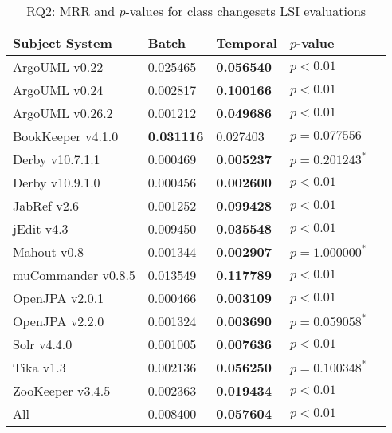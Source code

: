 
\begin{table}[t]
\renewcommand{\arraystretch}{1.3}
\footnotesize
\centering
\caption{RQ2: MRR and $p$-values for class changesets LSI evaluations}
\begin{tabular}{l|ll|ll}
   \toprule
    Subject System & Batch & Temporal & $p$-value  \\
    \midrule

ArgoUML v0.22 & 0.025465 & {\bf 0.056540 } & $p < 0.01$ \\
ArgoUML v0.24 & 0.002817 & {\bf 0.100166 } & $p < 0.01$ \\
ArgoUML v0.26.2 & 0.001212 & {\bf 0.049686 } & $p < 0.01$ \\
BookKeeper v4.1.0 & {\bf 0.031116 } & 0.027403 & $p = 0.077556$ \\
Derby v10.7.1.1 & 0.000469 & {\bf 0.005237 } & $p = 0.201243^{*}$ \\
Derby v10.9.1.0 & 0.000456 & {\bf 0.002600 } & $p < 0.01$ \\
JabRef v2.6 & 0.001252 & {\bf 0.099428 } & $p < 0.01$ \\
jEdit v4.3 & 0.009450 & {\bf 0.035548 } & $p < 0.01$ \\
Mahout v0.8 & 0.001344 & {\bf 0.002907 } & $p = 1.000000^{*}$ \\
muCommander v0.8.5 & 0.013549 & {\bf 0.117789 } & $p < 0.01$ \\
OpenJPA v2.0.1 & 0.000466 & {\bf 0.003109 } & $p < 0.01$ \\
OpenJPA v2.2.0 & 0.001324 & {\bf 0.003690 } & $p = 0.059058^{*}$ \\
Solr v4.4.0 & 0.001005 & {\bf 0.007636 } & $p < 0.01$ \\
Tika v1.3 & 0.002136 & {\bf 0.056250 } & $p = 0.100348^{*}$ \\
ZooKeeper v3.4.5 & 0.002363 & {\bf 0.019434 } & $p < 0.01$ \\
\midrule
All & 0.008400 & {\bf 0.057604 } & $p < 0.01$ \\

    \bottomrule
\end{tabular}
\label{table:rq2:class:lsi}
\end{table}

